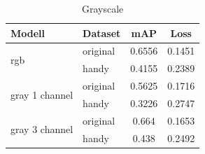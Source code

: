 \begin{table}[htb]
    \centering
    \label{tab:eval_gray}
    \begin{tabular}{| l | l || c | c |} 
        \hline
        Modell & Dataset & mAP & Loss\\
        \hline
        \multirow{2}{*}{rgb} & original & 0.6556 & 0.1451 \\
        & handy & 0.4155 & 0.2389 \\
        \hline
        \multirow{2}{*}{gray 1 channel} & original & 0.5625 & 0.1716 \\
        & handy & 0.3226 & 0.2747 \\
        \hline
        \multirow{2}{*}{gray 3 channel} & original & 0.664 & 0.1653 \\
        & handy & 0.438 & 0.2492 \\
        \hline
    \end{tabular}        
    \caption{Grayscale}
\end{table}


